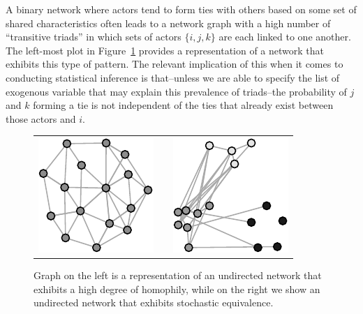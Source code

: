 \documentclass[9pt,twocolumn,twoside,lineno]{pnas-new}
\begin{document}
A binary network where actors tend to form ties with others based on some set of shared characteristics often leads to a network graph with a high number of ``transitive triads'' in which  sets of actors $\{i,j,k\}$ are each linked to one another. The left-most plot in Figure~\ref{fig:homphStochEquivNet} provides a representation of a network that exhibits this type of pattern. The relevant implication of this when it comes to conducting statistical inference is that--unless we are able to specify the list of exogenous variable that may explain this prevalence of triads--the probability of $j$ and $k$ forming a tie is not independent of the ties that already exist between those actors and $i$.

\begin{figure}[ht]
	\centering
	\caption{Graph on the left is a representation of an undirected network that exhibits a high degree of homophily, while on the right we show an undirected network that exhibits stochastic equivalence.}	
	\begin{tabular}{lcr}
	\includegraphics[width=.15\textwidth]{homophNet} & \hspace{1cm} &
	\includegraphics[width=.15\textwidth]{stochEquivNet}
	\end{tabular}
	\label{fig:homphStochEquivNet}
\end{figure}
\end{document}
